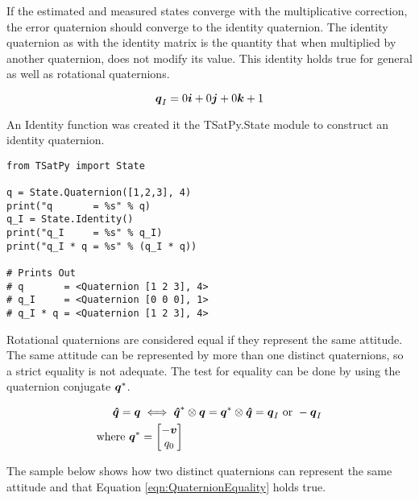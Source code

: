 If the estimated and measured states converge with the multiplicative correction, the error quaternion should converge to the identity quaternion.  The identity quaternion as with the identity matrix is the quantity that when multiplied by another quaternion, does not modify its value.  This identity holds true for general as well as rotational quaternions.

\begin{equation}
  \boldsymbol{q}_I = 0 \boldsymbol{i} + 0 \boldsymbol{j} + 0 \boldsymbol{k} + 1
\end{equation}

An Identity function was created it the TSatPy.State module to construct an identity quaternion.

\begin{singlespace}
  \begin{verbatim}
from TSatPy import State

q = State.Quaternion([1,2,3], 4)
print("q       = %s" % q)
q_I = State.Identity()
print("q_I     = %s" % q_I)
print("q_I * q = %s" % (q_I * q))

# Prints Out
# q       = <Quaternion [1 2 3], 4>
# q_I     = <Quaternion [0 0 0], 1>
# q_I * q = <Quaternion [1 2 3], 4>
  \end{verbatim}
  \nocite{minted}
\end{singlespace}

Rotational quaternions are considered equal if they represent the same attitude.  The same attitude can be represented by more than one distinct quaternions, so a strict equality is not adequate.  The test for equality can be done by using the quaternion conjugate $\boldsymbol{q}^*$.

\begin{subequations}
  \begin{align}
    \boldsymbol{\hat{q}} = \boldsymbol{q} & \iff \boldsymbol{\hat{q}}^* \otimes \boldsymbol{q} = \boldsymbol{q}^* \otimes \boldsymbol{\hat{q}} = \boldsymbol{q}_I \text{ or } -\boldsymbol{q}_I \\
    \text{where } \boldsymbol{q}^* &= \begin{bmatrix} -\boldsymbol{v} \\ q_0 \end{bmatrix}
  \end{align}
  \label{eqn:QuaternionEquality}
\end{subequations}

The sample below shows how two distinct quaternions can represent the same attitude and that Equation \ref{eqn:QuaternionEquality} holds true.

